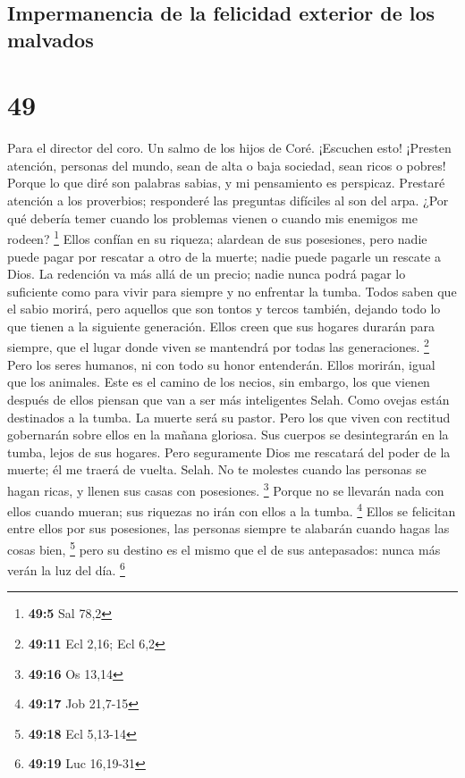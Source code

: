 \hypertarget{impermanencia-de-la-felicidad-exterior-de-los-malvados}{%
\subsection{Impermanencia de la felicidad exterior de los
malvados}\label{impermanencia-de-la-felicidad-exterior-de-los-malvados}}

\hypertarget{section-48}{%
\section{49}\label{section-48}}

Para el director del coro. Un salmo de los hijos de Coré. 
¡Escuchen esto! ¡Presten atención, personas del mundo,  sean
de alta o baja sociedad, sean ricos o pobres!  Porque lo que
diré son palabras sabias, y mi pensamiento es perspicaz. 
Prestaré atención a los proverbios; responderé las preguntas difíciles
al son del arpa.  ¿Por qué debería temer cuando los
problemas vienen o cuando mis enemigos me rodeen? \footnote{\textbf{49:5}
  Sal 78,2}  Ellos confían en su riqueza; alardean de sus
posesiones,  pero nadie puede pagar por rescatar a otro de
la muerte; nadie puede pagarle un rescate a Dios.  La
redención va más allá de un precio; nadie nunca podrá pagar lo
suficiente  como para vivir para siempre y no enfrentar la
tumba.  Todos saben que el sabio morirá, pero aquellos que
son tontos y tercos también, dejando todo lo que tienen a la siguiente
generación.  Ellos creen que sus hogares durarán para
siempre, que el lugar donde viven se mantendrá por todas las
generaciones. \footnote{\textbf{49:11} Ecl 2,16; Ecl 6,2} 
Pero los seres humanos, ni con todo su honor entenderán. Ellos morirán,
igual que los animales.  Este es el camino de los necios,
sin embargo, los que vienen después de ellos piensan que van a ser más
inteligentes Selah.  Como ovejas están destinados a la
tumba. La muerte será su pastor. Pero los que viven con rectitud
gobernarán sobre ellos en la mañana gloriosa. Sus cuerpos se
desintegrarán en la tumba, lejos de sus hogares.  Pero
seguramente Dios me rescatará del poder de la muerte; él me traerá de
vuelta. Selah.  No te molestes cuando las personas se hagan
ricas, y llenen sus casas con posesiones. \footnote{\textbf{49:16} Os
  13,14}  Porque no se llevarán nada con ellos cuando
mueran; sus riquezas no irán con ellos a la tumba. \footnote{\textbf{49:17}
  Job 21,7-15}  Ellos se felicitan entre ellos por sus
posesiones, las personas siempre te alabarán cuando hagas las cosas
bien, \footnote{\textbf{49:18} Ecl 5,13-14}  pero su
destino es el mismo que el de sus antepasados: nunca más verán la luz
del día. \footnote{\textbf{49:19} Luc 16,19-31}

